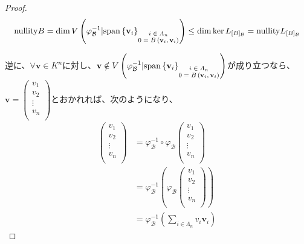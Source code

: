\documentclass[dvipdfmx]{jsarticle}
\begin{document}
\begin{proof}
\begin{align*}
{\mathrm{nullity}}B = \dim{V\left( \varphi_{\mathcal{B}}^{- 1}|{\mathrm{span}}\left\{ \mathbf{v}_{i} \right\}_{\scriptsize \begin{matrix} i \in \varLambda_{n} \\0 = B\left( \mathbf{v}_{i},\mathbf{v}_{i} \right) \end{matrix}} \right)} \leq \dim{\ker L_{[ B]_{\mathcal{B}}}} = {\mathrm{nullity}}L_{[ B]_{\mathcal{B}}}
\end{align*}\par
逆に、$\forall\mathbf{v} \in K^{n}$に対し、$\mathbf{v} \notin V\left( \varphi_{\mathcal{B}}^{- 1}|{\mathrm{span}}\left\{ \mathbf{v}_{i} \right\}_{\scriptsize \begin{matrix} i \in \varLambda_{n} \\0 = B\left( \mathbf{v}_{i},\mathbf{v}_{i} \right) \end{matrix}} \right)$が成り立つなら、$\mathbf{v} = \begin{pmatrix}
v_{1} \\
v_{2} \\
 \vdots \\
v_{n} \\
\end{pmatrix}$とおかれれば、次のようになり、
\begin{align*}
\begin{pmatrix}
v_{1} \\
v_{2} \\
 \vdots \\
v_{n} \\
\end{pmatrix} &= \varphi_{\mathcal{B}}^{- 1} \circ \varphi_{\mathcal{B}}\begin{pmatrix}
v_{1} \\
v_{2} \\
 \vdots \\
v_{n} \\
\end{pmatrix}\\
&= \varphi_{\mathcal{B}}^{- 1}\left( \varphi_{\mathcal{B}}\begin{pmatrix}
v_{1} \\
v_{2} \\
 \vdots \\
v_{n} \\
\end{pmatrix} \right)\\
&= \varphi_{\mathcal{B}}^{- 1}\left( \sum_{i \in \varLambda_{n}} {v_{i}\mathbf{v}_{i}} \right)
\end{align*}

\end{proof}
\end{document}
